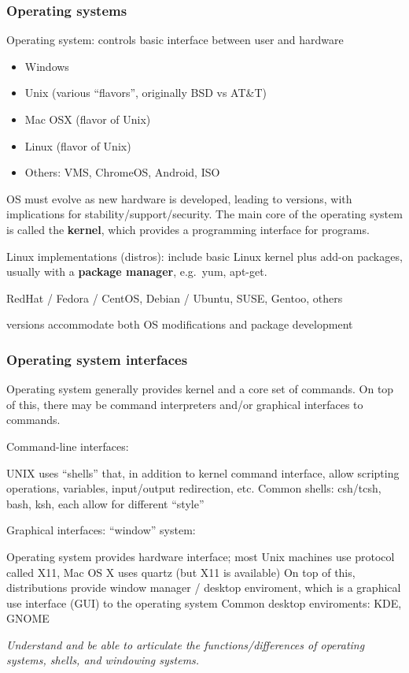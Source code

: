 \documentclass{article}
\newcommand{\test}[1]{%
    \begin{center}
        \colorbox{hl}{\parbox{0.9\textwidth}{\emph{#1}}}
    \end{center}}
\begin{document}
\subsubsection{Operating systems}
Operating system: controls basic interface between user and hardware
\begin{itemize}
    \item Windows
    \item Unix (various ``flavors'', originally BSD vs AT\&T)
    \item Mac OSX (flavor of Unix)
    \item Linux (flavor of Unix)
    \item Others: VMS, ChromeOS, Android, ISO
\end{itemize}
OS must evolve as new hardware is developed, leading to versions, with
implications for stability/support/security. The main core of the
operating system is called the {\bf kernel}, which provides a programming
interface for programs.

Linux implementations (distros): include basic Linux kernel plus
add-on packages, usually with a {\bf package manager}, e.g.\ yum, apt-get.

RedHat / Fedora / CentOS, Debian / Ubuntu, SUSE, Gentoo, others

versions accommodate both OS modifications and package development
\subsubsection{Operating system interfaces}
Operating system generally provides kernel and a core set of commands.
On top of this, there may be command interpreters and/or graphical
interfaces to commands.

Command-line interfaces:

UNIX uses ``shells'' that, in addition to kernel command interface,
allow scripting operations, variables, input/output redirection, etc.
Common shells: csh/tcsh, bash, ksh, each allow for different ``style''

Graphical interfaces: ``window'' system:

Operating system provides hardware interface; most Unix machines use
protocol called X11, Mac OS X uses quartz (but X11 is available)
On top of this, distributions provide window manager / desktop
enviroment, which is a graphical use interface (GUI) to the operating
system
Common desktop enviroments: KDE, GNOME

\test{Understand and be able to articulate the functions/differences
of operating systems, shells, and windowing systems.}
\end{document}
